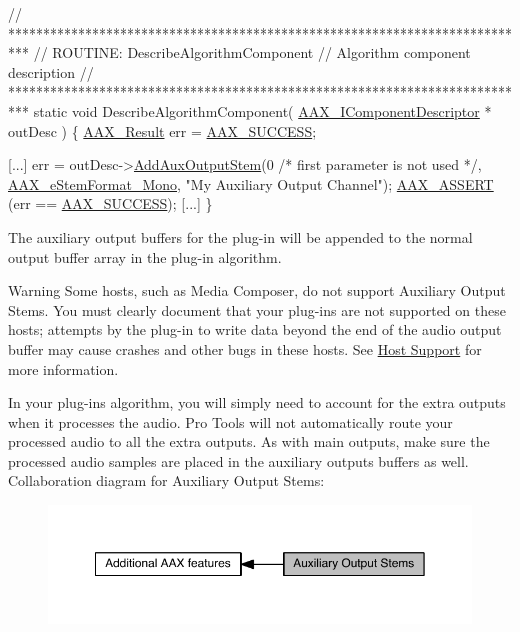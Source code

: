 \begin{DoxyCode}
\textcolor{comment}{// ***************************************************************************}
\textcolor{comment}{// ROUTINE: DescribeAlgorithmComponent}
\textcolor{comment}{// Algorithm component description}
\textcolor{comment}{// ***************************************************************************}
\textcolor{keyword}{static} \textcolor{keywordtype}{void} DescribeAlgorithmComponent( \hyperlink{a00088}{AAX\_IComponentDescriptor} * outDesc )
\{
    \hyperlink{a00149_a4d8f69a697df7f70c3a8e9b8ee130d2f}{AAX\_Result}                    err = \hyperlink{a00207_a5f8c7439f3a706c4f8315a9609811937aeddbd1bb67e3a66e6af54a4b4a7a57b3}{AAX\_SUCCESS};
            
    [...]
    err = outDesc->\hyperlink{a00088_a76266e8a07ce20cdbe5721172c32a93d}{AddAuxOutputStem}(0 \textcolor{comment}{/* first parameter is not used */},
                                    \hyperlink{a00206_ad8af5ef008b2bd478add9a0acb0a1d85a0cc08ddb9923a4093c820efe84588947}{AAX\_eStemFormat\_Mono},
                                    \textcolor{stringliteral}{"My Auxiliary Output Channel"});
    \hyperlink{a00158_a168ee44fd7a5485ab50160db36fb2988}{AAX\_ASSERT} (err == \hyperlink{a00207_a5f8c7439f3a706c4f8315a9609811937aeddbd1bb67e3a66e6af54a4b4a7a57b3}{AAX\_SUCCESS});
    [...]
\}   
\end{DoxyCode}


The auxiliary output buffers for the plug-\/in will be appended to the normal output buffer array in the plug-\/in algorithm.

\begin{DoxyWarning}{Warning}
Some hosts, such as Media Composer, do not support Auxiliary Output Stems. You must clearly document that your plug-\/ins are not supported on these hosts; attempts by the plug-\/in to write data beyond the end of the audio output buffer may cause crashes and other bugs in these hosts. See \hyperlink{a00373}{Host Support} for more information.
\end{DoxyWarning}
In your plug-\/in\textquotesingle{}s algorithm, you will simply need to account for the extra outputs when it processes the audio. Pro Tools will not automatically route your processed audio to all the extra outputs. As with main outputs, make sure the processed audio samples are placed in the auxiliary outputs\textquotesingle{} buffers as well. Collaboration diagram for Auxiliary Output Stems\+:
\nopagebreak
\begin{figure}[H]
\begin{center}
\leavevmode
\includegraphics[width=350pt]{a00339}
\end{center}
\end{figure}
